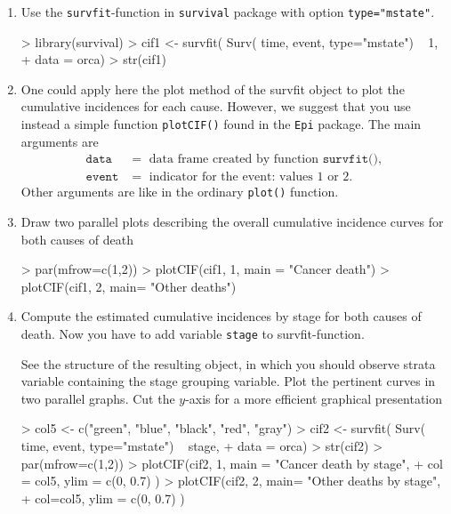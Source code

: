 \begin{enumerate}
\item
Use the \texttt{survfit}-function in \texttt{survival} package with option \texttt{type="mstate"}. 

\begin{Schunk}
\begin{Sinput}
> library(survival)
> cif1 <- survfit( Surv( time, event, type="mstate") ~ 1,
+                  data = orca)
> str(cif1)
\end{Sinput}
\end{Schunk}

\item
One could apply here the plot method of the survfit object to plot the 
cumulative incidences for each cause. However, we suggest that you use 
instead a simple function \texttt{plotCIF()} found in the \texttt{Epi} package.
The main arguments are
\begin{align}
\texttt{data } & = \text{ data frame created by function }\texttt{survfit()},\\
\texttt{event} & = \text{ indicator for the event: values 1 or 2}.
\end{align}
Other arguments are like in the ordinary \texttt{plot()} function.

\item
Draw two parallel plots describing
the overall cumulative incidence curves for both causes of death
\begin{Schunk}
\begin{Sinput}
> par(mfrow=c(1,2))
> plotCIF(cif1, 1, main = "Cancer death")
> plotCIF(cif1, 2, main= "Other deaths")
\end{Sinput}
\end{Schunk}

\item
Compute the estimated
cumulative incidences by stage for both causes of death.
Now you have to add variable \texttt{stage} to survfit-function. 

See the structure of the resulting object, in which you should
observe strata variable containing the stage grouping variable. Plot the pertinent curves in two parallel graphs.
Cut the $y$-axis for a more efficient graphical presentation

\begin{Schunk}
\begin{Sinput}
> col5 <- c("green", "blue", "black", "red", "gray")
> cif2 <- survfit( Surv( time, event, type="mstate") ~ stage,
+                  data = orca)
> str(cif2)
> par(mfrow=c(1,2))
> plotCIF(cif2, 1, main = "Cancer death by stage",
+         col = col5, ylim = c(0, 0.7) )
> plotCIF(cif2, 2, main= "Other deaths by stage",
+         col=col5, ylim = c(0, 0.7) )
\end{Sinput}
\end{Schunk}


\end{enumerate}
